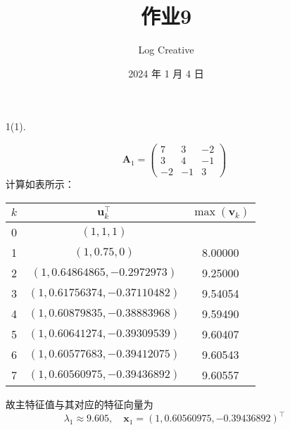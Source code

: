 \documentclass{sjtuarticle}
\title{作业9}
\author{Log Creative}
\date{2024 年 1 月 4 日}
\begin{document}
\maketitle


\begin{itemize}
    \item[1(1).] \begin{solution}
        \begin{equation*}
        \mathbf{A}_1=\begin{pmatrix}
            7 & 3 & -2 \\ 3 & 4 & -1 \\ -2 & -1 & 3
        \end{pmatrix}
    \end{equation*}
    计算如表所示：
    \begin{table}[h]
        \centering
        \begin{tabular}{ccc}
            \toprule
            $k$ & $\mathbf{u}_k^\top$ & $\max(\mathbf{v}_k)$ \\
            \midrule
            0 & $(1,1,1)$ & \\
1     &   $(1  , 0.75       , 0         )$    & 8.00000 \\
2     &   $( 1 , 0.64864865 , -0.2972973 )$   & 9.25000 \\
3     &   $( 1 , 0.61756374 , -0.37110482)$   & 9.54054 \\
4     &   $( 1 , 0.60879835 , -0.38883968)$   & 9.59490 \\
5     &   $( 1 , 0.60641274 , -0.39309539)$   & 9.60407 \\
6     &   $( 1 , 0.60577683 , -0.39412075)$   & 9.60543 \\
7     &   $( 1 , 0.60560975 , -0.39436892)$   & 9.60557 \\
            \bottomrule
        \end{tabular}
    \end{table}

    故主特征值与其对应的特征向量为
    \begin{equation*}
        \lambda_1\approx 9.605,\quad \mathbf{x}_1=( 1 , 0.60560975 , -0.39436892)^\top
    \end{equation*}
    \end{solution}


\end{itemize}
\end{document}
